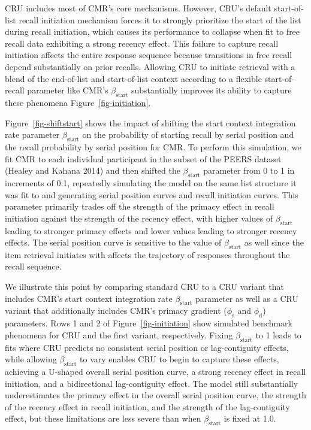 \documentclass[
  letterpaper,
  11pt,
  english,
  singlespacing,
  headsepline]{MastersDoctoralThesis}
\begin{document}
CRU includes most of CMR's core mechanisms. However, CRU's default
start-of-list recall initiation mechanism forces it to strongly
prioritize the start of the list during recall initiation, which causes
its performance to collapse when fit to free recall data exhibiting a
strong recency effect. This failure to capture recall initiation affects
the entire response sequence because transitions in free recall depend
substantially on prior recalls. Allowing CRU to initiate retrieval with
a blend of the end-of-list and start-of-list context according to a
flexible start-of-recall parameter like CMR's \(\beta_\text{start}\)
substantially improves its ability to capture these phenomena
Figure~\ref{fig-initiation}.

Figure~\ref{fig-shiftstart} shows the impact of shifting the start
context integration rate parameter \(\beta_\text{start}\) on the
probability of starting recall by serial position and the recall
probability by serial position for CMR. To perform this simulation, we
fit CMR to each individual participant in the subset of the PEERS
dataset (Healey and Kahana 2014) and then shifted the
\(\beta_\text{start}\) parameter from 0 to 1 in increments of 0.1,
repeatedly simulating the model on the same list structure it was fit to
and generating serial position curves and recall initiation curves. This
parameter primarily trades off the strength of the primacy effect in
recall initiation against the strength of the recency effect, with
higher values of \(\beta_\text{start}\) leading to stronger primacy
effects and lower values leading to stronger recency effects. The serial
position curve is sensitive to the value of \(\beta_\text{start}\) as
well since the item retrieval initiates with affects the trajectory of
responses throughout the recall sequence.

We illustrate this point by comparing standard CRU to a CRU variant that
includes CMR's start context integration rate \(\beta_\text{start}\)
parameter as well as a CRU variant that additionally includes CMR's
primacy gradient (\(\phi_\text{s}\) and \(\phi_\text{d}\)) parameters.
Rows 1 and 2 of Figure~\ref{fig-initiation} show simulated benchmark
phenomena for CRU and the first variant, respectively. Fixing
\(\beta_\text{start}\) to 1 leads to fits where CRU predicts no
consistent serial position or lag-contiguity effects, while allowing
\(\beta_\text{start}\) to vary enables CRU to begin to capture these
effects, achieving a U-shaped overall serial position curve, a strong
recency effect in recall initiation, and a bidirectional lag-contiguity
effect. The model still substantially underestimates the primacy effect
in the overall serial position curve, the strength of the recency effect
in recall initiation, and the strength of the lag-contiguity effect, but
these limitations are less severe than when \(\beta_\text{start}\) is
fixed at 1.0.
\end{document}
